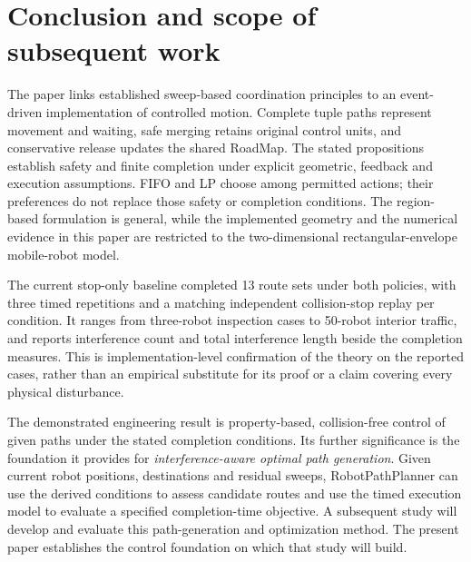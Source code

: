 \documentclass[11pt,a4paper]{article}
\theoremstyle{remark}
\begin{document}
\section{Conclusion and scope of subsequent work}
The paper links established sweep-based coordination principles to an event-driven
implementation of controlled motion. Complete tuple paths represent
movement and waiting, safe merging retains original control units, and
conservative release updates the shared RoadMap. The stated propositions
establish safety and finite completion under explicit geometric, feedback
and execution assumptions. FIFO and LP choose among permitted actions;
their preferences do not replace those safety or completion conditions.
The region-based formulation is general, while the implemented geometry
and the numerical evidence in this paper are restricted to the two-dimensional
rectangular-envelope mobile-robot model.

The current stop-only baseline completed 13 route sets under both policies,
with three timed repetitions and a matching independent collision-stop
replay per condition. It ranges from three-robot inspection cases to
50-robot interior traffic,
and reports interference count and total interference length beside the
completion measures. This is implementation-level confirmation of the
theory on the reported cases, rather than an empirical substitute for its
proof or a claim covering every physical disturbance.

The demonstrated engineering result is property-based, collision-free control of
given paths under the stated completion conditions. Its further significance
is the foundation it provides for \emph{interference-aware optimal path
generation}. Given current robot positions, destinations and residual
sweeps, RobotPathPlanner can use the derived conditions to assess candidate
routes and use the timed execution model to evaluate a specified
completion-time objective. A subsequent study will develop and evaluate
this path-generation and optimization method. The present paper establishes
the control foundation on which that study will build.
\end{document}
